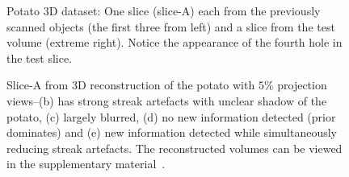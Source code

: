 \documentclass[journal]{IEEEtran}
\begin{document}
\begin{figure}[!h]
\begin{subfigure}[b]{0.235\linewidth}
\captionsetup{labelformat=empty}
\caption{}
\label{fig:potato3D_test}
     \end{subfigure}
      \caption{Potato 3D dataset: One slice (slice-A) each from the previously scanned objects (the first three from left) and a slice from the test 
        volume (extreme right). Notice the appearance of the fourth
        hole in the test slice. }
\label{fig:object-prior_test_potato_A}
\end{figure}

\begin{figure}[!h]
\centering
{}\hfill
{}\hfill
{}\hfill
{}\hfill
{}
\caption{Slice-A from 3D reconstruction of the potato with $5\%$ projection views--(b) has strong streak artefacts with unclear shadow of the potato, (c) largely blurred, (d) no new information detected (prior dominates) and (e) new information detected while simultaneously reducing streak artefacts. The reconstructed volumes can be viewed in the supplementary material~\cite{supp_paper}.}
\label{fig:potato_3D_results_A}
\end{figure}
\end{document}
